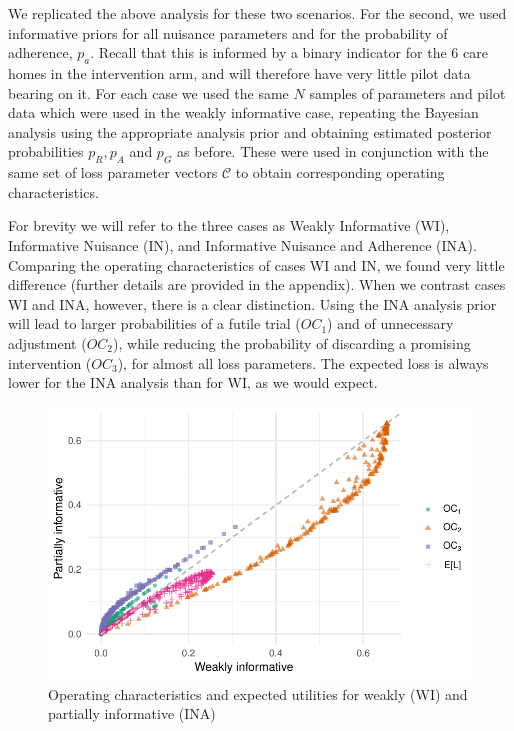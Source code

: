 \documentclass[AMA,STIX1COL]{WileyNJD-v2}
\begin{document}
We replicated the above analysis for these two scenarios. For the second, we used informative priors for all nuisance parameters and for the probability of adherence, $p_a$. Recall that this is informed by a binary indicator for the 6 care homes in the intervention arm, and will therefore have very little pilot data bearing on it. For each case we used the same $N$ samples of parameters and pilot data which were used in the weakly informative case, repeating the Bayesian analysis using the appropriate analysis prior and obtaining estimated posterior probabilities $p_R, p_A$ and $p_G$ as before. These were used in conjunction with the same set of loss parameter vectors $\mathcal{C}$ to obtain corresponding operating characteristics.

For brevity we will refer to the three cases as Weakly Informative (WI), Informative Nuisance (IN), and Informative Nuisance and Adherence (INA). Comparing the operating characteristics of cases WI and IN, we found very little difference (further details are provided in the appendix). When we contrast cases WI and INA, however, there is a clear distinction. Using the INA analysis prior will lead to larger probabilities of a futile trial ($OC_1$) and of unnecessary adjustment ($OC_2$), while reducing the probability of discarding a promising intervention ($OC_3$), for almost all loss parameters. The expected loss is always lower for the INA analysis than for WI, as we would expect.


\begin{figure}
\centering
\includegraphics[scale=0.8]{./figures/an_prior_comp}
\caption{Operating characteristics and expected utilities for weakly (WI) and partially informative (INA)}
\label{fig:an_prior_comp}
\end{figure}
\end{document}
